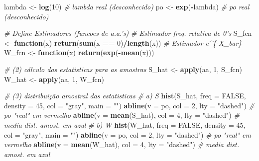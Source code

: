 \documentclass[
]{book}
\newenvironment{Shaded}{\begin{snugshade}}{\end{snugshade}}
\newcommand{\CommentTok}[1]{\textcolor[rgb]{0.56,0.35,0.01}{\textit{#1}}}
\newcommand{\ControlFlowTok}[1]{\textcolor[rgb]{0.13,0.29,0.53}{\textbf{#1}}}
\newcommand{\DataTypeTok}[1]{\textcolor[rgb]{0.13,0.29,0.53}{#1}}
\newcommand{\DecValTok}[1]{\textcolor[rgb]{0.00,0.00,0.81}{#1}}
\newcommand{\KeywordTok}[1]{\textcolor[rgb]{0.13,0.29,0.53}{\textbf{#1}}}
\newcommand{\NormalTok}[1]{#1}
\newcommand{\OperatorTok}[1]{\textcolor[rgb]{0.81,0.36,0.00}{\textbf{#1}}}
\newcommand{\OtherTok}[1]{\textcolor[rgb]{0.56,0.35,0.01}{#1}}
\newcommand{\StringTok}[1]{\textcolor[rgb]{0.31,0.60,0.02}{#1}}
\theoremstyle{definition}
\theoremstyle{definition}
\theoremstyle{definition}
\theoremstyle{remark}
\begin{document}
\begin{Shaded}
\begin{Highlighting}[]
\NormalTok{lambda <-}\StringTok{ }\KeywordTok{log}\NormalTok{(}\DecValTok{10}\NormalTok{)  }\CommentTok{# lambda real (desconhecido)}
\NormalTok{po <-}\StringTok{ }\KeywordTok{exp}\NormalTok{(}\OperatorTok{-}\NormalTok{lambda) }\CommentTok{# po real (desconhecido)}

\CommentTok{# Define Estimadores (funcoes de a.a.'s)}
\CommentTok{# Estimador freq. relativa de 0's}
\NormalTok{S_fcn <-}\StringTok{ }\ControlFlowTok{function}\NormalTok{(x) }\KeywordTok{return}\NormalTok{(}\KeywordTok{sum}\NormalTok{(x }\OperatorTok{==}\StringTok{ }\DecValTok{0}\NormalTok{)}\OperatorTok{/}\KeywordTok{length}\NormalTok{(x))}
\CommentTok{# Estimador e^\{-X_bar\}}
\NormalTok{W_fcn <-}\StringTok{ }\ControlFlowTok{function}\NormalTok{(x) }\KeywordTok{return}\NormalTok{(}\KeywordTok{exp}\NormalTok{(}\OperatorTok{-}\KeywordTok{mean}\NormalTok{(x)))}

\CommentTok{# (2) cálculo das estatisticas para as amostras}
\NormalTok{S_hat <-}\StringTok{ }\KeywordTok{apply}\NormalTok{(aa, }\DecValTok{1}\NormalTok{, S_fcn)}
\NormalTok{W_hat <-}\StringTok{ }\KeywordTok{apply}\NormalTok{(aa, }\DecValTok{1}\NormalTok{, W_fcn) }

\CommentTok{# (3) distribuição amostral das estatisticas}
\CommentTok{# a) S}
\KeywordTok{hist}\NormalTok{(S_hat, }\DataTypeTok{freq =} \OtherTok{FALSE}\NormalTok{,}
     \DataTypeTok{density =} \DecValTok{45}\NormalTok{, }\DataTypeTok{col =} \StringTok{"gray"}\NormalTok{,}
     \DataTypeTok{main =} \StringTok{""}\NormalTok{)}
\KeywordTok{abline}\NormalTok{(}\DataTypeTok{v =}\NormalTok{ po, }\DataTypeTok{col =} \DecValTok{2}\NormalTok{,  }\DataTypeTok{lty =} \StringTok{"dashed"}\NormalTok{)         }\CommentTok{# po "real" em  vermelho}
\KeywordTok{abline}\NormalTok{(}\DataTypeTok{v =} \KeywordTok{mean}\NormalTok{(S_hat), }\DataTypeTok{col =} \DecValTok{4}\NormalTok{, }\DataTypeTok{lty =} \StringTok{"dashed"}\NormalTok{) }\CommentTok{# media dist. amost. em  azul}
\CommentTok{# b) W}
\KeywordTok{hist}\NormalTok{(W_hat, }\DataTypeTok{freq =} \OtherTok{FALSE}\NormalTok{,}
     \DataTypeTok{density =} \DecValTok{45}\NormalTok{, }\DataTypeTok{col =} \StringTok{"gray"}\NormalTok{,}
     \DataTypeTok{main =} \StringTok{""}\NormalTok{)}
\KeywordTok{abline}\NormalTok{(}\DataTypeTok{v =}\NormalTok{ po, }\DataTypeTok{col =} \DecValTok{2}\NormalTok{,  }\DataTypeTok{lty =} \StringTok{"dashed"}\NormalTok{)         }\CommentTok{# po "real" em  vermelho}
\KeywordTok{abline}\NormalTok{(}\DataTypeTok{v =} \KeywordTok{mean}\NormalTok{(W_hat), }\DataTypeTok{col =} \DecValTok{4}\NormalTok{, }\DataTypeTok{lty =} \StringTok{"dashed"}\NormalTok{) }\CommentTok{# media dist. amost. em  azul}
\end{Highlighting}
\end{Shaded}
\end{document}
